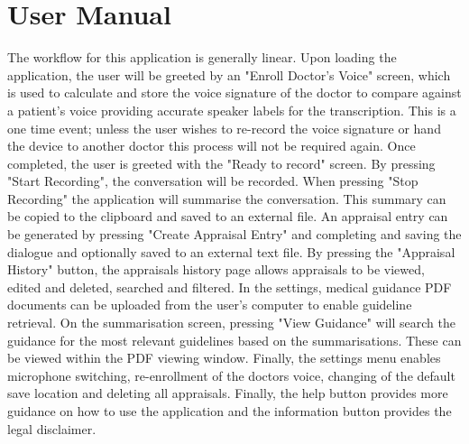 \chapter{User Manual}
\label{app:user_manual}
The workflow for this application is generally linear. Upon loading the application, the user will be greeted by an "Enroll Doctor's Voice" screen, which is used to calculate and store the voice signature of the doctor to compare against a patient's voice providing accurate speaker labels for the transcription. This is a one time event; unless the user wishes to re-record the voice signature or hand the device to another doctor this process will not be required again. Once completed, the user is greeted with the "Ready to record" screen. By pressing "Start Recording", the conversation will be recorded. When pressing "Stop Recording" the application will summarise the conversation. This summary can be copied to the clipboard and saved to an external file. An appraisal entry can be generated by pressing "Create Appraisal Entry" and completing and saving the dialogue and optionally saved to an external text file. By pressing the "Appraisal History" button, the appraisals history page allows appraisals to be viewed, edited and deleted, searched and filtered. In the settings, medical guidance PDF documents can be uploaded from the user's computer to enable guideline retrieval. On the summarisation screen, pressing "View Guidance" will search the guidance for the most relevant guidelines based on the summarisations. These can be viewed within the PDF viewing window. Finally, the settings menu enables microphone switching, re-enrollment of the doctors voice, changing of the default save location and deleting all appraisals. Finally, the help button provides more guidance on how to use the application and the information button provides the legal disclaimer.